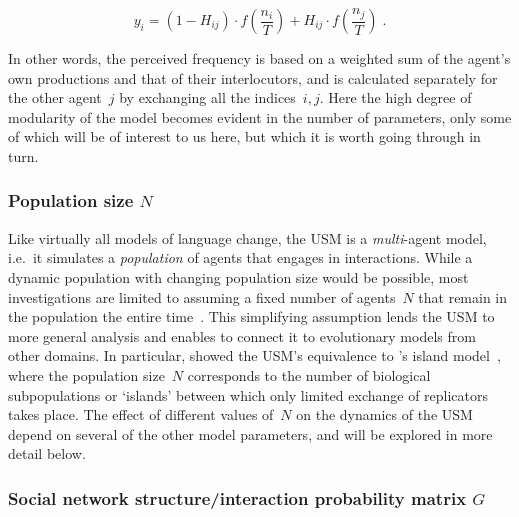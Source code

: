 \begin{equation}\label{eq:perceivedfrequency}
y_i = (1-H_{ij})\cdot f(\frac{n_i}{T}) + H_{ij}\cdot f(\frac{n_j}{T})\;.
\end{equation}

In other words, the perceived frequency is based on a weighted sum of the agent's own productions and that of their interlocutors, and is calculated separately for the other agent~$j$ by exchanging all the indices~$i, j$.
Here the high degree of modularity of the model becomes evident in the number of parameters, only some of which will be of interest to us here, but which it is worth going through in turn.

\subsubsection{Population size $N$}

Like virtually all models of language change, the USM is a \emph{multi}-agent model, i.e.~it simulates a \emph{population} of agents that engages in interactions. While a dynamic population with changing population size would be possible, most investigations are limited to assuming a fixed number of agents~$N$ that remain in the population the entire time~\citep[again see][for an exception]{Baxter2016}. This simplifying assumption lends the USM to more general analysis and enables to connect it to evolutionary models from other domains. In particular, \citet{Blythe2007divided} showed the USM's equivalence to \citeauthor{Wright1931}'s island model~\citeyearpar{Wright1931}, where the population size~$N$ corresponds to the number of biological subpopulations or `islands' between which only limited exchange of replicators takes place. The effect of different values of~$N$ on the dynamics of the USM depend on several of the other model parameters, and will be explored in more detail below.

\subsubsection{Social network structure/interaction probability matrix $G$}

